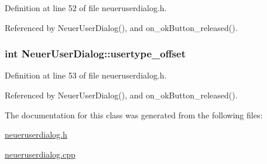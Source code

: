 Definition at line 52 of file neueruserdialog.h.

Referenced by NeuerUserDialog(), and on\_\-okButton\_\-released().\hypertarget{class_neuer_user_dialog_acbf834639fcd4aef2b62f69ea594eac}{
\subsubsection[usertype\_\-offset]{\setlength{\rightskip}{0pt plus 5cm}int {\bf NeuerUserDialog::usertype\_\-offset}}}
\label{class_neuer_user_dialog_acbf834639fcd4aef2b62f69ea594eac}




Definition at line 53 of file neueruserdialog.h.

Referenced by NeuerUserDialog(), and on\_\-okButton\_\-released().

The documentation for this class was generated from the following files:\begin{CompactItemize}
\item 
\hyperlink{neueruserdialog_8h}{neueruserdialog.h}\item 
\hyperlink{neueruserdialog_8cpp}{neueruserdialog.cpp}\end{CompactItemize}
